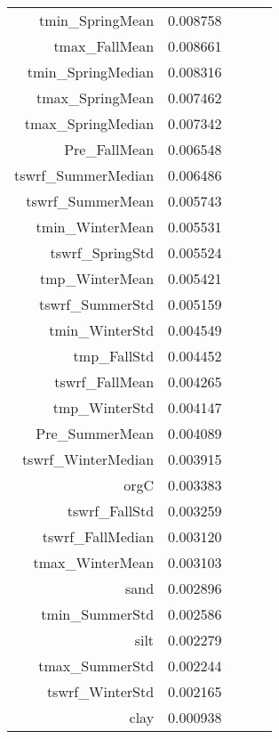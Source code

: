 \begin{tabular}{rrrrr}
tmin_SpringMean & 0.008758 \\
tmax_FallMean & 0.008661 \\
tmin_SpringMedian & 0.008316 \\
tmax_SpringMean & 0.007462 \\
tmax_SpringMedian & 0.007342 \\
Pre_FallMean & 0.006548 \\
tswrf_SummerMedian & 0.006486 \\
tswrf_SummerMean & 0.005743 \\
tmin_WinterMean & 0.005531 \\
tswrf_SpringStd & 0.005524 \\
tmp_WinterMean & 0.005421 \\
tswrf_SummerStd & 0.005159 \\
tmin_WinterStd & 0.004549 \\
tmp_FallStd & 0.004452 \\
tswrf_FallMean & 0.004265 \\
tmp_WinterStd & 0.004147 \\
Pre_SummerMean & 0.004089 \\
tswrf_WinterMedian & 0.003915 \\
orgC & 0.003383 \\
tswrf_FallStd & 0.003259 \\
tswrf_FallMedian & 0.003120 \\
tmax_WinterMean & 0.003103 \\
sand & 0.002896 \\
tmin_SummerStd & 0.002586 \\
silt & 0.002279 \\
tmax_SummerStd & 0.002244 \\
tswrf_WinterStd & 0.002165 \\
clay & 0.000938 \\
\bottomrule
\end{tabular}
